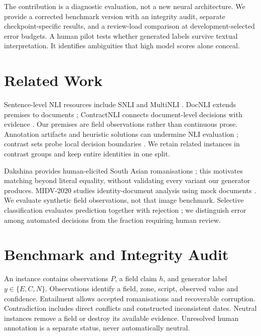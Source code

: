 \documentclass[11pt]{article}
\begin{document}
The contribution is a diagnostic evaluation, not a new neural architecture.
We provide a corrected benchmark version with an integrity audit, separate
checkpoint-specific results, and a review-load comparison at development-selected
error budgets. A human pilot tests whether generated labels survive textual
interpretation. It identifies ambiguities that high model scores alone conceal.

\section{Related Work}
Sentence-level NLI resources include SNLI and MultiNLI
\citep{bowman2015snli,williams2018mnli}. DocNLI extends premises to documents
\citep{yin2021docnli}; ContractNLI connects document-level decisions with evidence
\citep{koreeda2021contractnli}. Our premises are field observations rather than
continuous prose. Annotation artifacts and heuristic solutions can undermine
NLI evaluation \citep{gururangan2018annotation,mccoy2019right}; contrast sets
probe local decision boundaries \citep{gardner2020contrast}. We retain related
instances in contrast groups and keep entire identities in one split.

Dakshina provides human-elicited South Asian romanisations
\citep{roark2020dakshina}; this motivates matching beyond literal equality,
without validating every variant our generator produces. MIDV-2020 studies
identity-document analysis using mock documents \citep{bulatov2021midv2020}.
We evaluate synthetic field observations, not that image benchmark. Selective
classification evaluates prediction together with rejection
\citep{elyaniv2010foundations,geifman2017selective}; we distinguish error among
automated decisions from the fraction requiring human review.

\section{Benchmark and Integrity Audit}
An instance contains observations $P$, a field claim $h$, and generator label
$y\in\{E,C,N\}$. Observations identify a field, zone, script, observed value
and confidence. Entailment allows accepted romanisations and recoverable
corruption. Contradiction includes direct conflicts and constructed inconsistent
dates. Neutral instances remove a field or destroy its available evidence.
Unresolved human annotation is a separate status, never automatically neutral.
\end{document}
